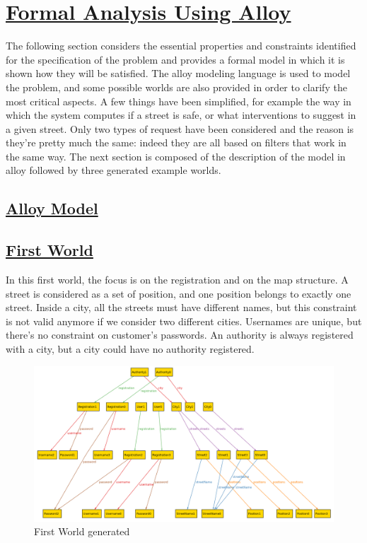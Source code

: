 \section[Formal Analysis Using Alloy]{\hyperlink{toc}{Formal Analysis Using Alloy}}
	\label{sec:formalAnalysisUsingAlloy}
	The following section considers the essential properties and constraints identified for the specification of the problem and provides a formal model in which it is shown how they will be satisfied. The alloy modeling language is used to model the problem, and some possible worlds are also provided in order to clarify the most critical aspects. 
	A few things have been simplified, for example the way in which the system computes if a street is safe, or what interventions to suggest in a given street. Only two types of request have been considered and the reason is they're pretty much the same: indeed they are all based on filters that work in the same way. The next section is composed of the description of the model in alloy followed by three generated example worlds.
	
	\subsection[Alloy Model]{\hyperlink{toc}{Alloy Model}}
	
	
	\subsection[First World]{\hyperlink{toc}{First World}}
	In this first world, the focus is on the registration and on the map structure. 
	A street is considered as a set of position, and one position belongs to exactly one street. Inside a city, all the streets must have different names, but this constraint is not valid anymore if we consider two different cities.
	Usernames are unique, but there's no constraint on customer's passwords.
	An authority is always registered with a city, but a city could have no authority registered.
	
	\begin{figure}[h!]
		\centering
		\includegraphics[scale=0.35]{Files/alloy/world1.png}
		\caption{First World generated}
	\end{figure}
	
